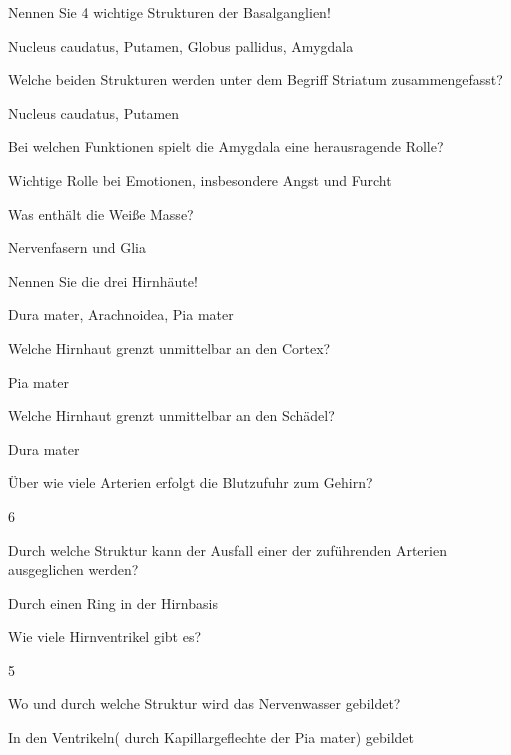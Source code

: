 \documentclass[10pt, a4paper]{exam}
\begin{document}
\begin{questions}
  \question Nennen Sie 4 wichtige Strukturen der Basalganglien!
  \begin{solution}
    Nucleus caudatus, Putamen, Globus pallidus, Amygdala
  \end{solution}

  \question Welche beiden Strukturen werden unter dem Begriff Striatum zusammengefasst?
  \begin{solution}
    Nucleus caudatus, Putamen
  \end{solution}

  \question Bei welchen Funktionen spielt die Amygdala eine herausragende Rolle?
  \begin{solution}
    Wichtige Rolle bei Emotionen, insbesondere Angst und Furcht
  \end{solution}

  \question Was enthält die Weiße Masse?
  \begin{solution}
    Nervenfasern und Glia
  \end{solution}

  \question Nennen Sie die drei Hirnhäute!
  \begin{solution}
    Dura mater, Arachnoidea, Pia mater
  \end{solution}

  \question Welche Hirnhaut grenzt unmittelbar an den Cortex?
  \begin{solution}
    Pia mater
  \end{solution}

  \question Welche Hirnhaut grenzt unmittelbar an den Schädel?
  \begin{solution}
    Dura mater
  \end{solution}

  \question Über wie viele Arterien erfolgt die Blutzufuhr zum Gehirn?
  \begin{solution}
    6
  \end{solution}

  \question Durch welche Struktur kann der Ausfall einer der zuführenden Arterien ausgeglichen werden?
  \begin{solution}
    Durch einen Ring in der Hirnbasis
  \end{solution}

  \question Wie viele Hirnventrikel gibt es?
  \begin{solution}
5
  \end{solution}

  \question Wo und durch welche Struktur wird das Nervenwasser gebildet?
  \begin{solution}
    In den Ventrikeln( durch Kapillargeflechte der Pia mater) gebildet
  \end{solution}


\end{questions}
\end{document}
